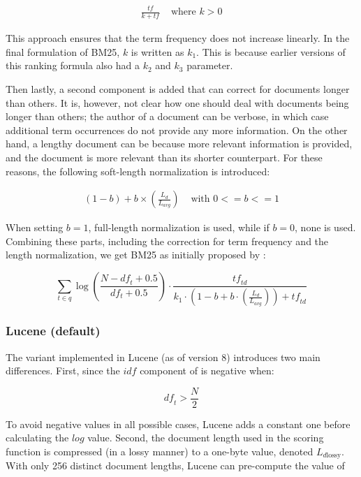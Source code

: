 \begin{align}
	\frac{\mathit{tf}}{k+\mathit{tf}} & \text{ where } k>0
\end{align}

This approach ensures that the term frequency does not increase linearly. In the final formulation of BM25, $k$ is written as $k_1$. This is because earlier versions of this ranking formula also had a $k_2$ and $k_3$ parameter. 

Then lastly, a second component is added that can correct for documents longer than others. It is, however, not clear how one should deal with documents being longer than others; the author of a document can be verbose, in which case additional term occurrences do not provide any more information. On the other hand, a lengthy document can be because more relevant information is provided, and the document is more relevant than its shorter counterpart. For these reasons, the following soft-length normalization is introduced:

\begin{align}
	\left(1-b\right) + b \times \left(\frac{L_d}{L_{\mathit{avg}}}\right) & \text{ with } 0 <= b <= 1
\end{align}

When setting $b=1$, full-length normalization is used, while if $b=0$, none is used. Combining these parts, including the correction for term frequency and the length normalization, we get BM25 as initially proposed by \citet{bm25-robertson}:

\begin{equation}
	\label{bm25-robertson}
	\sum_{t\in q} \log\left(\frac{N-\mathit{df}_t+0.5}{df_t+0.5}\right)\cdot\frac{\mathit{tf}_{\mathit{td}}}{k_1\cdot\left(1-b+b\cdot\left(\frac{L_d}{L_{\mathit{avg}}}\right)\right) + \mathit{tf}_{\mathit{td}}}
\end{equation}

\subsubsection{Lucene (default)}
The variant implemented in Lucene (as of version 8) introduces two main differences. First, since the $\mathit{idf}$ component of \citet{bm25-robertson} is negative when:

\begin{equation}
	\mathit{df}_t > \frac{N}{2} 
\end{equation}

To avoid negative values in all possible cases, Lucene adds a constant one before calculating the $log$ value. 
Second, the document length used in the scoring function is compressed (in a lossy manner) to a one-byte value, denoted $L_{d\text{lossy}}$. With only 256 distinct document lengths, Lucene can pre-compute the value of

